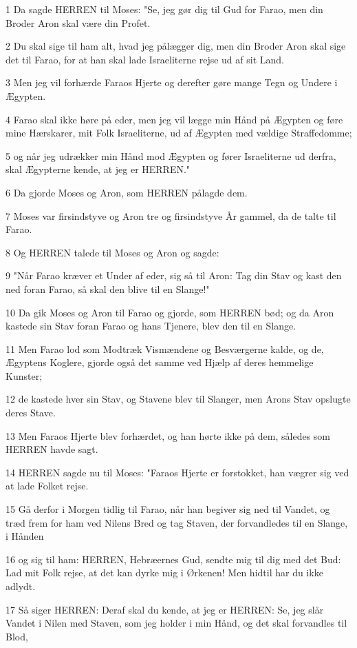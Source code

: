 \par 1 Da sagde HERREN til Moses: "Se, jeg gør dig til Gud for Farao, men din Broder Aron skal være din Profet.
\par 2 Du skal sige til ham alt, hvad jeg pålægger dig, men din Broder Aron skal sige det til Farao, for at han skal lade Israeliterne rejse ud af sit Land.
\par 3 Men jeg vil forhærde Faraos Hjerte og derefter gøre mange Tegn og Undere i Ægypten.
\par 4 Farao skal ikke høre på eder, men jeg vil lægge min Hånd på Ægypten og føre mine Hærskarer, mit Folk Israeliterne, ud af Ægypten med vældige Straffedomme;
\par 5 og når jeg udrækker min Hånd mod Ægypten og fører Israeliterne ud derfra, skal Ægypterne kende, at jeg er HERREN."
\par 6 Da gjorde Moses og Aron, som HERREN pålagde dem.
\par 7 Moses var firsindstyve og Aron tre og firsindstyve År gammel, da de talte til Farao.
\par 8 Og HERREN talede til Moses og Aron og sagde:
\par 9 "Når Farao kræver et Under af eder, sig så til Aron: Tag din Stav og kast den ned foran Farao, så skal den blive til en Slange!"
\par 10 Da gik Moses og Aron til Farao og gjorde, som HERREN bød; og da Aron kastede sin Stav foran Farao og hans Tjenere, blev den til en Slange.
\par 11 Men Farao lod som Modtræk Vismændene og Besværgerne kalde, og de, Ægyptens Koglere, gjorde også det samme ved Hjælp af deres hemmelige Kunster;
\par 12 de kastede hver sin Stav, og Stavene blev til Slanger, men Arons Stav opslugte deres Stave.
\par 13 Men Faraos Hjerte blev forhærdet, og han hørte ikke på dem, således som HERREN havde sagt.
\par 14 HERREN sagde nu til Moses: "Faraos Hjerte er forstokket, han vægrer sig ved at lade Folket rejse.
\par 15 Gå derfor i Morgen tidlig til Farao, når han begiver sig ned til Vandet, og træd frem for ham ved Nilens Bred og tag Staven, der forvandledes til en Slange, i Hånden
\par 16 og sig til ham: HERREN, Hebræernes Gud, sendte mig til dig med det Bud: Lad mit Folk rejse, at det kan dyrke mig i Ørkenen! Men hidtil har du ikke adlydt.
\par 17 Så siger HERREN: Deraf skal du kende, at jeg er HERREN: Se, jeg slår Vandet i Nilen med Staven, som jeg holder i min Hånd, og det skal forvandles til Blod,
